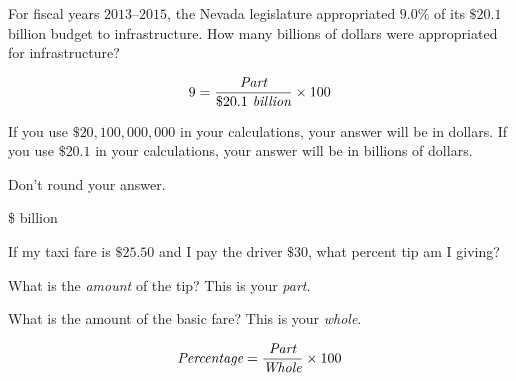 \documentclass{ximera}
\begin{document}
\begin{question}
For fiscal years $2013$--$2015$, the Nevada legislature appropriated $9.0\%$ of its $\$20.1$ billion budget to infrastructure. How many billions of dollars were appropriated for infrastructure? 	

\begin{hint}
\[9=\frac{\emph{\text{Part}}}{\$20.1\emph{\text{ billion}}}\times 100\]
\end{hint}
\begin{hint}
If you use $\$20,100,000,000$ in your calculations, your answer will be in dollars. If you use $\$20.1$ in your calculations, your answer will be in billions of dollars.
\end{hint}
\begin{hint}
Don't round your answer.
\end{hint}
\$ billion

\end{question}

\begin{question}
If my taxi fare is $\$25.50$ and I pay the driver $\$30$, what percent tip am I giving?

    \begin{multipleChoice}
    \end{multipleChoice}
    \begin{hint}
    What is the \emph{amount} of the tip? This is your \emph{part}.
    \end{hint}
    \begin{hint}
   What is the amount of the basic fare? This is your \emph{whole}.
    \end{hint}
  	\begin{hint}
    \[\emph{\text{Percentage}}=\frac{\emph{\text{Part}}}{\emph{\text{Whole}}}\times 100\]
    \end{hint}

\end{question}
\end{document}
